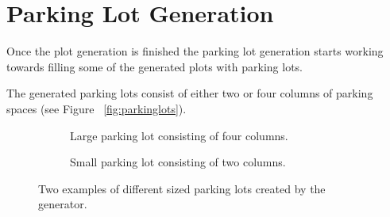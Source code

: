 \section{Parking Lot Generation}

Once the plot generation is finished the parking lot generation starts working towards filling some of the generated plots with parking lots.

The generated parking lots consist of either two or four columns of parking spaces (see Figure ~\ref{fig:parkinglots}).
\begin{figure}[H]
   \centering
   \begin{subfigure}[b]{0.485\textwidth}
     \caption{Large parking lot consisting of four columns.}
   \end{subfigure}
   \quad
   \begin{subfigure}[b]{0.45\textwidth}
     \caption{Small parking lot consisting of two columns.}
   \end{subfigure}
     \caption{Two examples of different sized parking lots created by the generator.}
   \label{fig:sizebased}
 \end{figure}
